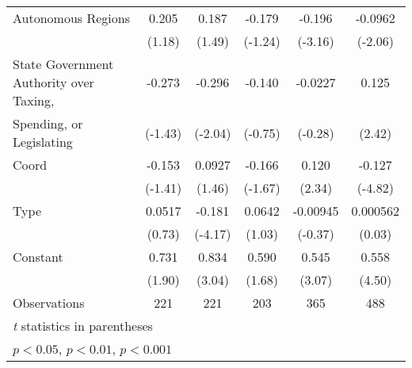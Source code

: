 \begin{table}[htbp]
\begin{tabular}{l*{5}{c}}
\addlinespace
Autonomous Regions                      &    0.205         &    0.187         &   -0.179         &   -0.196\sym{**} &  -0.0962\sym{*}  \\
                                        &   (1.18)         &   (1.49)         &  (-1.24)         &  (-3.16)         &  (-2.06)         \\
\addlinespace
State Government Authority over Taxing, &   -0.273         &   -0.296\sym{*}  &   -0.140         &  -0.0227         &    0.125\sym{*}  \\
Spending, or Legislating                &  (-1.43)         &  (-2.04)         &  (-0.75)         &  (-0.28)         &   (2.42)         \\
\addlinespace
Coord                                   &   -0.153         &   0.0927         &   -0.166         &    0.120\sym{*}  &   -0.127\sym{***}\\
                                        &  (-1.41)         &   (1.46)         &  (-1.67)         &   (2.34)         &  (-4.82)         \\
\addlinespace
Type                                    &   0.0517         &   -0.181\sym{***}&   0.0642         & -0.00945         & 0.000562         \\
                                        &   (0.73)         &  (-4.17)         &   (1.03)         &  (-0.37)         &   (0.03)         \\
\addlinespace
Constant                                &    0.731         &    0.834\sym{**} &    0.590         &    0.545\sym{**} &    0.558\sym{***}\\
                                        &   (1.90)         &   (3.04)         &   (1.68)         &   (3.07)         &   (4.50)         \\
\midrule
Observations                            &      221         &      221         &      203         &      365         &      488         \\
\bottomrule
\multicolumn{6}{l}{\footnotesize \textit{t} statistics in parentheses}\\
\multicolumn{6}{l}{\footnotesize \sym{*} \(p<0.05\), \sym{**} \(p<0.01\), \sym{***} \(p<0.001\)}\\
\end{tabular}
\end{table}
